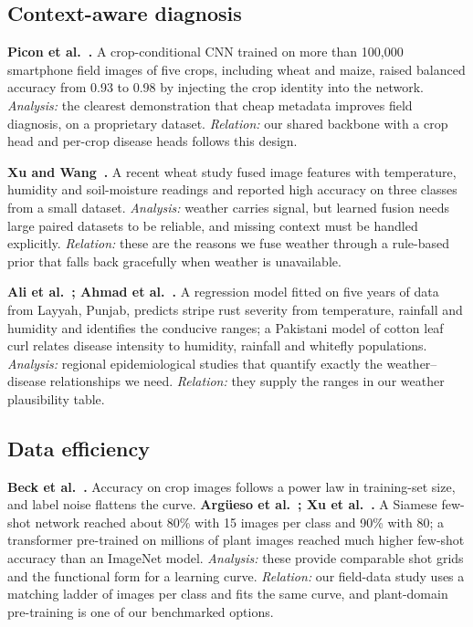 \subsection{Context-aware diagnosis}
\label{sec:lit-context}
\textbf{Picon et al.~\cite{picon2019cropcond}.} A crop-conditional CNN trained on more than 100,000 smartphone field images of five crops, including wheat and maize, raised balanced accuracy from 0.93 to 0.98 by injecting the crop identity into the network. \emph{Analysis:} the clearest demonstration that cheap metadata improves field diagnosis, on a proprietary dataset. \emph{Relation:} our shared backbone with a crop head and per-crop disease heads follows this design.

\textbf{Xu and Wang~\cite{xuwang2025fusion}.} A recent wheat study fused image features with temperature, humidity and soil-moisture readings and reported high accuracy on three classes from a small dataset. \emph{Analysis:} weather carries signal, but learned fusion needs large paired datasets to be reliable, and missing context must be handled explicitly. \emph{Relation:} these are the reasons we fuse weather through a rule-based prior that falls back gracefully when weather is unavailable.

\textbf{Ali et al.~\cite{ali2023striperust}; Ahmad et al.~\cite{ahmad2018clcuv}.} A regression model fitted on five years of data from Layyah, Punjab, predicts stripe rust severity from temperature, rainfall and humidity and identifies the conducive ranges; a Pakistani model of cotton leaf curl relates disease intensity to humidity, rainfall and whitefly populations. \emph{Analysis:} regional epidemiological studies that quantify exactly the weather--disease relationships we need. \emph{Relation:} they supply the ranges in our weather plausibility table.

\subsection{Data efficiency}
\label{sec:lit-data}
\textbf{Beck et al.~\cite{beck2022curves}.} Accuracy on crop images follows a power law in training-set size, and label noise flattens the curve. \textbf{Argüeso et al.~\cite{argueso2020fewshot}; Xu et al.~\cite{xu2022transfer}.} A Siamese few-shot network reached about 80\% with 15 images per class and 90\% with 80; a transformer pre-trained on millions of plant images reached much higher few-shot accuracy than an ImageNet model. \emph{Analysis:} these provide comparable shot grids and the functional form for a learning curve. \emph{Relation:} our field-data study uses a matching ladder of images per class and fits the same curve, and plant-domain pre-training is one of our benchmarked options.

